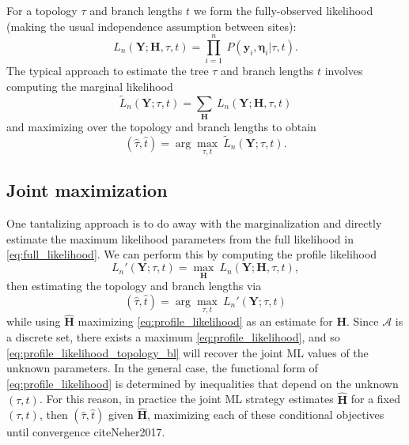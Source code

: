 \documentclass[a4paper]{article}
\newcommand{\alphabet}{\mathcal{A}}
\newcommand{\fullAlignment}{\mathbf{Y}}
\newcommand{\alignmentColumn}{\mathbf{y}}
\newcommand{\fullAncestralStates}{\mathbf{H}}
\newcommand{\ancestralStateColumn}{\boldsymbol\eta}
\begin{document}
For a topology $\tau$ and branch lengths $t$ we form the fully-observed likelihood (making the usual independence assumption between sites):
\begin{equation}
\label{eq:full_likelihood}
L_n(\fullAlignment;\fullAncestralStates, \tau, t) = \prod_{i=1}^{n} \ P(\alignmentColumn_i, \ancestralStateColumn_i | \tau, t).
\end{equation}
The typical approach to estimate the tree $\tau$ and branch lengths $t$ involves computing the marginal likelihood
\begin{equation}
\label{eq:marginal_likelihood}
\tilde{L}_n(\fullAlignment; \tau, t) = \sum_{\fullAncestralStates} \ L_n(\fullAlignment;\fullAncestralStates, \tau, t)
\end{equation}
and maximizing over the topology and branch lengths to obtain
$$
(\hat{\tau}, \hat{t}) = \arg\max_{\tau, t} \  \tilde{L}_n(\fullAlignment; \tau, t).
$$

\subsection{Joint maximization}

One tantalizing approach is to do away with the marginalization and directly estimate the maximum likelihood parameters from the full likelihood in \eqref{eq:full_likelihood}.
We can perform this by computing the profile likelihood
\begin{equation}
\label{eq:profile_likelihood}
L_n'(\fullAlignment;\tau, t) = \max_{\fullAncestralStates} \ L_n(\fullAlignment;\fullAncestralStates, \tau, t),
\end{equation}
then estimating the topology and branch lengths via
\begin{equation}
\label{eq:profile_likelihood_topology_bl}
(\hat{\tau}, \hat{t}) = \arg\max_{\tau, t} \ L_n'(\fullAlignment;\tau, t)
\end{equation}
while using $\hat{\fullAncestralStates}$ maximizing \eqref{eq:profile_likelihood} as an estimate for $\fullAncestralStates$.
Since $\alphabet$ is a discrete set, there exists a maximum \eqref{eq:profile_likelihood}, and so \eqref{eq:profile_likelihood_topology_bl} will recover the joint ML values of the unknown parameters.
In the general case, the functional form of \eqref{eq:profile_likelihood} is determined by inequalities that depend on the unknown $(\tau,t)$.
For this reason, in practice the joint ML strategy estimates $\hat{\fullAncestralStates}$ for a fixed $(\tau,t)$, then $(\hat{\tau},\hat{t})$ given $\hat{\fullAncestralStates}$, maximizing each of these conditional objectives until convergence cite{Neher2017}.
\end{document}
